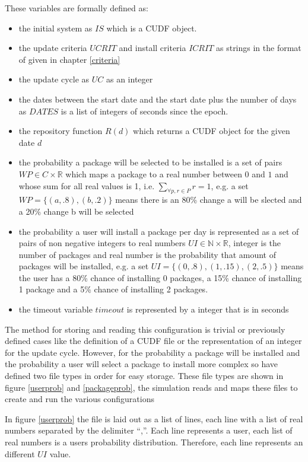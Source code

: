 These variables are formally defined as:
\begin{itemize}
  \item the initial system as $IS$ which is a CUDF object.
  \item the update criteria $UCRIT$ and install criteria $ICRIT$ as strings in the format of given in chapter \ref{criteria}
  \item the update cycle as $UC$ as an integer
  \item the dates between the start date and the start date plus the number of days as $DATES$ is a list of integers of seconds since the epoch.
  \item the repository function $R(d)$ which returns a CUDF object for the given date $d$
  \item the probability a package will be selected to be installed is a set of pairs $WP \in C \times \mathbb{R}$ which maps a package to a real number between $0$ and $1$ 
  and whose sum for all real values is 1, i.e. $\sum_{\forall p,r \in P}r = 1$,
  e.g. a set $WP = \{ (a,.8) , (b,.2)\}$ means there is an 80\% change a will be slected and a 20\% change b will be selected
  \item the probability a user will install a package per day is represented as a set of pairs of non negative integers to real numbers $UI \in \mathbb{N} \times \mathbb{R}$,
  integer is the number of packages and real number is the probability that amount of packages will be installed, 
  e.g.  a set $UI = \{ (0,.8) , (1,.15), (2,.5)\}$ means the user has a 80\% chance of installing 0 packages, a 15\% chance of installing 1 package and a
  5\% chance of installing 2 packages.
  \item the timeout variable $timeout$ is represented by a integer that is in seconds
\end{itemize} 

The method for storing and reading this configuration is trivial or previously defined cases like the definition of a CUDF file or the representation of an integer for the update cycle.
However, for the probability a package will be installed and the probability a user will select a package to install more complex so have defined two file types in order for easy storage.
These file types are shown in figure \ref{userprob} and \ref{packageprob}, the simulation reads and maps these files to create and run the various configurations

In figure \ref{userprob} the file is laid out as a list of lines, each line with a list of real numbers separated by the delimiter ``,''.
Each line represents a user, each list of real numbers is a users probability distribution.
Therefore, each line represents an different $UI$ value.

